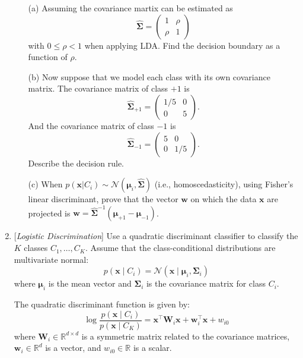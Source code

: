 \documentclass[10pt]{article}
\begin{document}
\begin{enumerate}
\begin{itemize}
\item[(a)]  Assuming the covariance martix can be estimated as
\[
\hat{\mathbf{\Sigma}}=\begin{pmatrix}1 & \rho\\
\rho & 1
\end{pmatrix}
\]
with $0\leq\rho<1$ when applying LDA. Find the decision boundary
as a function of $\rho$. 
\item[(b)]  Now suppose that we model each class with its own covariance matrix.
The covariance matrix of class $+1$ is
\[
\hat{\mathbf{\Sigma}}_{+1}=\begin{pmatrix}1/5 & 0\\
0 & 5
\end{pmatrix}.
\]
And the covariance matrix of class $-1$ is
\[
\hat{\mathbf{\Sigma}}_{-1}=\begin{pmatrix}5 & 0\\
0 & 1/5
\end{pmatrix}.
\]
Describe the decision rule. 
\item[(c)]  When $p\left(\bm{x}\left|C_{i}\right.\right)\sim\mathcal{N}\left(\bm{\mu}_{i},\hat{\bm{\Sigma}}\right)$
(i.e., homoscedasticity), using Fisher's linear discriminant, prove that the vector $\mathbf{w}$ on which the data $\bm{x}$
are projected is $\mathbf{w}=\hat{\bm{\Sigma}}^{-1}\left(\bm{\mu}_{+1}-\bm{\mu}_{-1}\right)$.
\end{itemize}

\newpage

\item {} [\textit{Logistic Discrimination}]
Use a quadratic discriminant classifier to classify the $K$ classes $C_{1},\dots,C_{K}$. Assume that the class-conditional distributions are multivariate normal:
\[
p\left(\mathbf{x} \mid C_i\right) = \mathcal{N}\left(\mathbf{x} \mid \boldsymbol{\mu}_i, \boldsymbol{\Sigma}_i\right)
\]
where $\boldsymbol{\mu}_i$ is the mean vector and $\boldsymbol{\Sigma}_i$ is the covariance matrix for class $C_i$.

The quadratic discriminant function is given by:
\begin{equation}
	\label{eq:quad-discriminant}
	\log\frac{p\left(\mathbf{x}\mid C_{i}\right)}{p\left(\mathbf{x}\mid C_{K}\right)}=\mathbf{x}^{\top}\mathbf{W}_{i}\mathbf{x}+\mathbf{w}_{i}^{\top}\mathbf{x}+w_{i0}
\end{equation}
where $\mathbf{W}_{i} \in \mathbb{R}^{d\times d}$ is a symmetric matrix related to the covariance matrices, $\mathbf{w}_{i} \in \mathbb{R}^{d}$ is a vector, and $w_{i0} \in \mathbb{R}$ is a scalar.


\end{enumerate}
\end{document}
